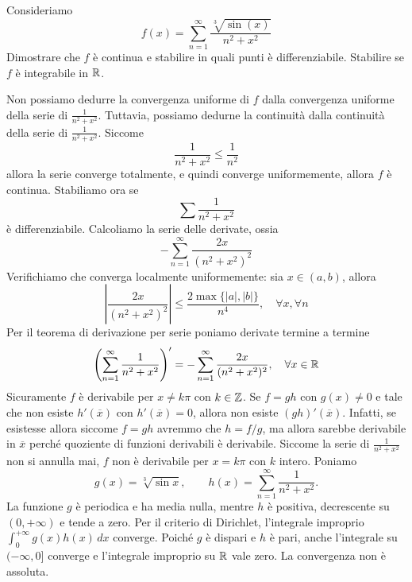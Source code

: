 \documentclass[a4paper]{article}
\begin{document}
\begin{radioactive}
\begin{snippetexercise}{}
    Consideriamo \[
        f(x) = \sum_{n=1}^\infty \frac{
            \sqrt[3]{\sin(x)}
        }{
            n^2 + x^2
        }
    \]
    Dimostrare che \(f\) è continua e stabilire in quali punti è differenziabile.
    Stabilire se \(f\) è integrabile in \(\mathbb{R}\).
\end{snippetexercise}
\end{radioactive}

\begin{radioactive}
\begin{snippetsolution}{}
    Non possiamo dedurre la convergenza uniforme di \(f\) dalla convergenza uniforme della serie
    di \(\frac{1}{n^2 + x^2}\). Tuttavia, possiamo dedurne la continuità dalla continuità della serie di \(\frac{1}{n^2 + x^2}\).
    Siccome \[
        \frac{1}{n^2 + x^2} \leq \frac{1}{n^2}
    \]
    allora la serie converge totalmente, e quindi converge uniformemente, allora \(f\) è continua.
    Stabiliamo ora se
    \[
        \sum \frac{1}{n^2 + x^2}
    \]
    è differenziabile.
    Calcoliamo la serie delle derivate, ossia
    \[
        - \sum_{n=1}^\infty \frac{2x}{(n^2 + x^2)^2}
    \]
    Verifichiamo che converga localmente uniformemente: sia \(x\in(a,b)\), allora
    \[
        \left|
        \frac{2x}{(n^2 + x^2)^2}
        \right| \leq \frac{
            2\max\{|a|, |b|\}
        }{n^4}, \quad \forall x, \forall n
    \]
    Per il teorema di derivazione per serie poniamo derivate termine a termine
    \[
        \left(
            \sum_{n=1}^\infty \frac{1}{n^2 + x^2}
        \right)' = - \sum_{n=1}^\infty \frac{2x}{(n^2 + x^2)^2}, \quad \forall x \in \mathbb{R}
    \]
    Sicuramente \(f\) è derivabile per \(x\neq k\pi\) con \(k\in\mathbb{Z}\).
    Se \(f = gh\) con \(g(x) \neq 0\) e tale che non esiste \(h'(\overline x)\) con
    \(h'(\overline x) = 0\), allora non esiste \((gh)'(\overline x)\).
    Infatti, se esistesse allora siccome \(f = gh\) avremmo che \(h = f/g\),
    ma allora sarebbe derivabile in \(\overline x\) perché quoziente di funzioni derivabili è derivabile.
    Siccome la serie di \(\frac{1}{n^2 + x^2}\) non si annulla mai, \(f\) non è derivabile
    per \(x = k\pi\) con \(k\) intero.
    Poniamo
    \[
        g(x)=\sqrt[3]{\sin x},
        \qquad
        h(x)=\sum_{n=1}^\infty\frac1{n^2+x^2}.
    \]
    La funzione \(g\) è periodica e ha media nulla, mentre \(h\) è positiva,
    decrescente su \((0,+\infty)\) e tende a zero. Per il criterio di Dirichlet,
    l'integrale improprio \(\int_0^{+\infty}g(x)h(x)\,dx\) converge. Poiché \(g\)
    è dispari e \(h\) è pari, anche l'integrale su \(( -\infty,0]\) converge e
    l'integrale improprio su \(\mathbb{R}\) vale zero. La convergenza non è assoluta.
\end{snippetsolution}
\end{radioactive}
\end{document}
